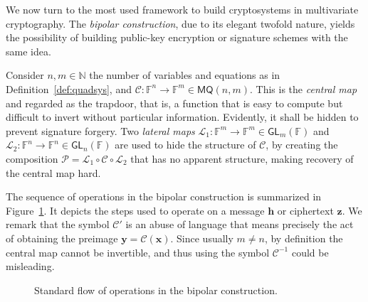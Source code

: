 \documentclass[draft, 12pt, a4paper, oneside]{memoir}
\theoremstyle{definition}
\begin{document}
We now turn to the most used framework to build cryptosystems in multivariate cryptography. The \emph{bipolar construction}, due to its elegant twofold nature, yields the possibility of building public-key encryption or signature schemes with the same idea. 

Consider $n, m \in \mathbb{N}$ the number of variables and equations as in Definition~\ref{def:quadsys}, and $\mathcal{C} : \mathbb{F}^{n} \to \mathbb{F}^{m} \in \mathsf{MQ}(n, m)$. This is the \emph{central map} and regarded as the trapdoor, that is, a function that is easy to compute but difficult to invert without particular information. Evidently, it shall be hidden to prevent signature forgery. Two \emph{lateral maps} $\mathcal{L}_{1} : \mathbb{F}^{m} \to \mathbb{F}^{m} \in \mathsf{GL}_{m}(\mathbb{F})$ and $\mathcal{L}_{2} : \mathbb{F}^{n} \to \mathbb{F}^{n} \in \mathsf{GL}_{n}(\mathbb{F})$ are used to hide the structure of $\mathcal{C}$, by creating the composition $\mathcal{P} = \mathcal{L}_{1} \circ \mathcal{C} \circ \mathcal{L}_{2}$ that has no apparent structure, making recovery of the central map hard.

The sequence of operations in the bipolar construction is summarized in Figure~\ref{fig:bipolar}. It depicts the steps used to operate on a message $\mathbf{h}$ or ciphertext $\mathbf{z}$. We remark that the symbol $\mathcal{C}'$ is an abuse of language that means precisely the act of obtaining the preimage $\mathbf{y} = \mathcal{C}(\mathbf{x})$. Since usually $m \neq n$, by definition the central map cannot be invertible, and thus using the symbol $\mathcal{C}^{-1}$ could be misleading.

\begin{figure}[htbp]
  \centering
  \caption{Standard flow of operations in the bipolar
    construction.}\label{fig:bipolar}
\end{figure}
\end{document}
